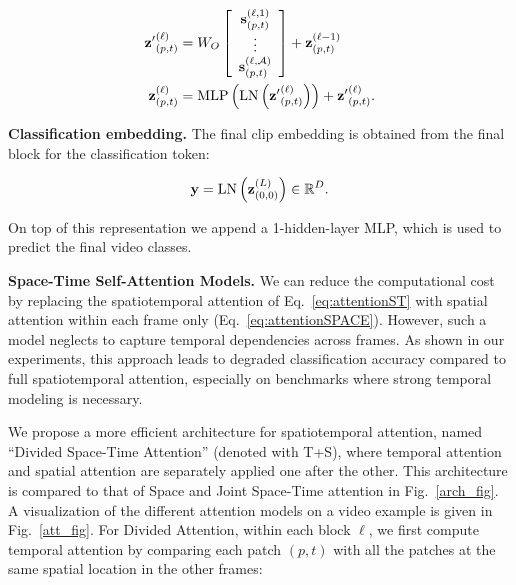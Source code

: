 \documentclass{article}
\begin{document}
\vspace{-0.3cm}
\begin{align}
{\bf z'}_{(p,t)}^{(\ell)} &= W_O \left[ \begin{array}{c} {\bf s}_{(p,t)}^{(\ell,1)}\\ \vdots \\ {\bf s}_{(p,t)}^{(\ell,\mathcal{A})} \end{array} \right] + {\bf z}_{(p,t)}^{(\ell-1)} \label{eq:hiddenstate}\\
{\bf z}_{(p,t)}^{(\ell)} &= \mathrm{MLP}\left(\mathrm{LN}\left({\bf z'}_{(p,t)}^{(\ell)}\right)\right) + {\bf z'}_{(p,t)}^{(\ell)}.\label{eq:encoding}
\end{align}

\textbf{Classification embedding.} The final clip embedding is obtained from the final block for the classification token:

\vspace{-0.1cm}
\begin{equation}
{\bf y} = \mathrm{LN}\left({\bf z}_{(0,0)}^{(L)}\right)  \in  \mathbb{R}^{D}.
\end{equation}
\vspace{-0.2cm}

On top of this representation we append a 1-hidden-layer MLP, which is used to predict the final video classes. %


\textbf{Space-Time Self-Attention Models.} We can reduce the computational cost by replacing the spatiotemporal attention of Eq.~\ref{eq:attentionST} with spatial attention within each frame only (Eq.~\ref{eq:attentionSPACE}). However, such a model neglects to capture temporal dependencies across frames. As shown in our experiments, this approach leads to degraded classification accuracy compared to full spatiotemporal attention, especially on benchmarks where strong temporal modeling is necessary. %

We propose a more efficient architecture for spatiotemporal attention, named ``Divided Space-Time Attention'' (denoted with T+S), where temporal attention and spatial attention are separately applied one after the other. This architecture is compared to that of Space and Joint Space-Time attention in Fig.~\ref{arch_fig}. A visualization of the different attention models on a video example is given in Fig.~\ref{att_fig}. For Divided Attention, within each block $\ell$, we first compute temporal attention by comparing each patch $(p,t)$ with all the patches at the same spatial location in the other frames:
\end{document}
